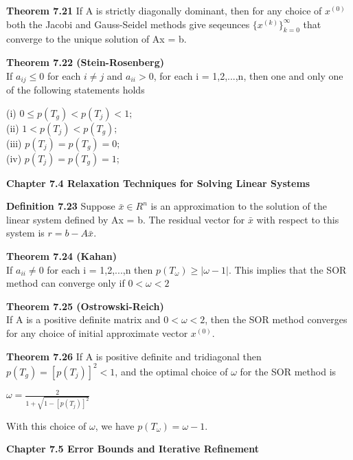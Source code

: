\documentclass{article}
\begin{document}
\textbf {Theorem 7.21} If A is strictly diagonally dominant, then for any choice of $x^{(0)}$ both the Jacobi and Gauss-Seidel methods give seqeunces $\{x^{(k)}\}_{k=0}^\infty$ that converge to the unique solution of Ax = b.

\textbf {Theorem 7.22 (Stein-Rosenberg)} \\
If $a_{ij} \leq 0$ for each $i \neq j$ and $a_{ii} > 0$, for each i = 1,2,...,n, then one and only one of the following statements holds
\begin{center}
(i) $ 0 \leq p(T_g) < p(T_j) < 1;$ \\
(ii) $1 < p(T_j) < p(T_g);$ \\
(iii) $p(T_j) = p(T_g) = 0;$ \\
(iv) $p(T_j) = p(T_g) = 1$;
\end{center}

\textbf {Chapter 7.4 Relaxation Techniques for Solving Linear Systems}

\textbf {Definition 7.23} Suppose $\bar{x} \in R^n$ is an approximation to the solution of the linear system defined by Ax = b. The residual vector for $\bar{x}$ with respect to this system is $r = b - A \bar{x}$.

\textbf {Theorem 7.24 (Kahan)} \\
If $a_{ii} \neq 0$ for each i = 1,2,...,n then $p(T_\omega) \geq |\omega - 1|$. This implies that the SOR method can converge only if $0 < \omega < 2$

\textbf {Theorem 7.25 (Ostrowski-Reich)} \\
If A is a positive definite matrix and $0 < \omega < 2$, then the SOR method converges for any choice of initial approximate vector $x^{(0)}$.

\textbf {Theorem 7.26} If A is positive definite and tridiagonal then $p(T_g) = [p(T_j)]^2 < 1$, and the optimal choice of $\omega$ for the SOR method is 
\begin{center}
$\omega = \frac{2}{1 + \sqrt{1 - [p(T_j)]^2}}$
\end{center}
With this choice of $\omega$, we have $p(T_\omega) = \omega - 1$.

\textbf {Chapter 7.5 Error Bounds and Iterative Refinement}
\end{document}
